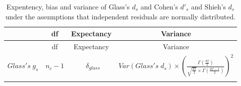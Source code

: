 \documentclass[
  man,floatsintext]{apa6}
\begin{document}
\newpage
\begin{landscape}

\begin{longtable}[]{@{}lccc@{}}
\caption{Expentency, bias and variance of Glass's \(d_s\) and Cohen's \(d'_s\) and Shieh's \(d_s\) under the assumptions that independent residuals are normally distributed.}\tabularnewline
\toprule
\begin{minipage}[b]{0.10\columnwidth}\raggedright
\strut
\end{minipage} & \begin{minipage}[b]{0.18\columnwidth}\centering
df\strut
\end{minipage} & \begin{minipage}[b]{0.16\columnwidth}\centering
Expectancy\strut
\end{minipage} & \begin{minipage}[b]{0.45\columnwidth}\centering
Variance\strut
\end{minipage}\tabularnewline
\midrule
\endfirsthead
\toprule
\begin{minipage}[b]{0.10\columnwidth}\raggedright
\strut
\end{minipage} & \begin{minipage}[b]{0.18\columnwidth}\centering
df\strut
\end{minipage} & \begin{minipage}[b]{0.16\columnwidth}\centering
Expectancy\strut
\end{minipage} & \begin{minipage}[b]{0.45\columnwidth}\centering
Variance\strut
\end{minipage}\tabularnewline
\midrule
\endhead
\begin{minipage}[t]{0.10\columnwidth}\raggedright
\(Glass's \; g_s\)\strut
\end{minipage} & \begin{minipage}[t]{0.18\columnwidth}\centering
\(n_c-1\)\strut
\end{minipage} & \begin{minipage}[t]{0.16\columnwidth}\centering
~\(\delta_{glass}\)\strut
\end{minipage} & \begin{minipage}[t]{0.45\columnwidth}\centering
\(Var(Glass's \; d_s) \times \left( \frac{\Gamma\left(\frac{df}{2} \right)}{\sqrt{\frac{df}{2}} \times \Gamma \left( \frac{df-1}{2}\right)}\right)^2\)\strut
\end{minipage}\tabularnewline
\begin{minipage}[t]{0.10\columnwidth}\raggedright

\end{minipage}
\end{longtable}
\end{landscape}
\end{document}
